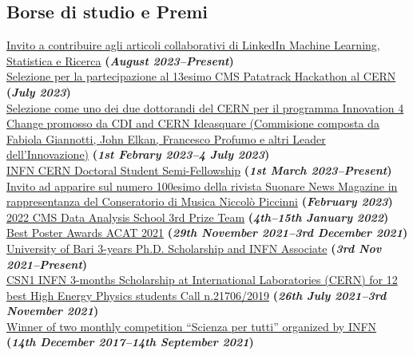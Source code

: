 \documentclass[11pt]{res}
\newcommand{\MarginText}[1]{\section{#1}\vspace{10pt}}
\begin{document}
\begin{resume}
\MarginText{Borse di studio e Premi}
\href{https://www.linkedin.com/advice/1/how-do-you-avoid-bias-machine-learning-imbalanced}{Invito a contribuire agli articoli collaborativi di LinkedIn Machine Learning, Statistica e Ricerca} \textbf{(\textit{August 2023--Present})}\\
\href{https://indico.cern.ch/event/1246472/}{Selezione per la partecipazione al 13esimo CMS Patatrack Hackathon al CERN} \textbf{(\textit{July 2023})}\\
\href{https://www.repubblica.it/tecnologia/2023/07/06/news/innovation_4_change__industry_leaders_summit_cern_di_ginevra-406876410/}{Selezione come uno dei due dottorandi del CERN per il programma Innovation 4 Change promosso da CDI and CERN Ideasquare (Commisione composta da Fabiola Giannotti, John Elkan, Francesco Profumo e altri Leader dell'Innovazione)} \textbf{(\textit{1st Febrary 2023--4 July 2023})}\\
\href{https://drive.google.com/file/d/1gvGcpn9FgzyjUBVwmCCa8zAbnvYefJAa/view?usp=share_link}{INFN CERN Doctoral Student Semi-Fellowship} \textbf{(\textit{1st March 2023--Present})}\\
\href{https://www.facebook.com/photo/?fbid=7238817049465803&set=pcb.6561954733818708}{Invito ad apparire sul numero 100esimo della rivista Suonare News Magazine in rappresentanza del Conseratorio di Musica Niccolò Piccinni} \textbf{(\textit{February 2023})}\\
\href{https://indico.cern.ch/event/1088671/}{2022 CMS Data Analysis School 3rd Prize Team} \textbf{(\textit{4th--15th January 2022})}\\
\href{https://indico.cern.ch/event/855454/contributions/4596351/}{Best Poster Awards ACAT 2021} \textbf{(\textit{29th November 2021--3rd December 2021})}\\
\href{https://dottorato.fisica.uniba.it}{University of Bari 3-years Ph.D. Scholarship and INFN Associate} \textbf{(\textit{3rd Nov 2021--Present})}\\
\href{https://drive.google.com/file/d/1-3EpNjAJlxgwI7W7nlvAxtIPrqbM1Xud/view?usp=sharing}{CSN1 INFN 3-months Scholarship at International Laboratories (CERN) for 12 best High Energy Physics students Call n.21706/2019} \textbf{(\textit{26th July 2021--3rd November 2021})}\\
\href{https://scienzapertutti.infn.it/spazio-scuola/concorso-mensile-sxt}{Winner of two monthly competition “Scienza per tutti” organized by INFN} \textbf{(\textit{14th December 2017--14th September 2021})}\\

\end{resume}
\end{document}
